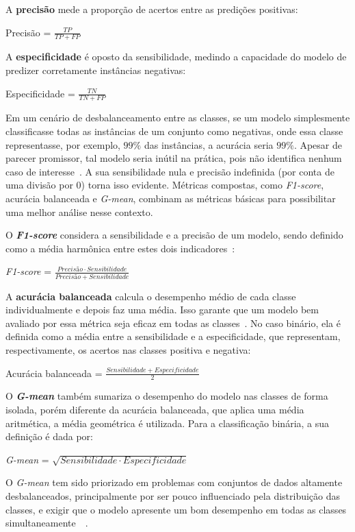 A \textbf{precisão} mede a proporção de acertos entre as predições positivas:
\begin{center}
  Precisão = $\frac{TP}{TP + FP}$
  \label{eq:precisao}
\end{center}

A \textbf{especificidade} é oposto da sensibilidade, medindo a capacidade do modelo de predizer corretamente instâncias negativas:
\begin{center}
  Especificidade = $\frac{TN}{TN + FP}$
  \label{eq:especificidade}
\end{center}

Em um cenário de desbalanceamento entre as classes, se um modelo simplesmente classificasse todas as instâncias de um conjunto como negativas, onde essa classe representasse, por exemplo, \(99\%\) das instâncias, a acurácia seria \(99\%\). Apesar de parecer promissor, tal modelo seria inútil na prática, pois não identifica nenhum caso de interesse~\cite{Naidu2023}. A sua sensibilidade nula e precisão indefinida (por conta de uma divisão por \(0\)) torna isso evidente. Métricas compostas, como \textit{F1-score}, acurácia balanceada e \textit{G-mean}, combinam as métricas básicas para possibilitar uma melhor análise nesse contexto.

O \textbf{\textit{F1-score}} considera a sensibilidade e a precisão de um modelo, sendo definido como a média harmônica entre estes dois indicadores~\cite{Grandini2020}:
\begin{center}
  \textit{F1-score} = $\frac{Precisão \cdot Sensibilidade}{Precisão + Sensibilidade}$
  \label{eq:f1-score}
\end{center}

A \textbf{acurácia balanceada} calcula o desempenho médio de cada classe individualmente e depois faz uma média. Isso garante que um modelo bem avaliado por essa métrica seja eficaz em todas as classes~\cite{Grandini2020}. No caso binário, ela é definida como a média entre a sensibilidade e a especificidade, que representam, respectivamente, os acertos nas classes positiva e negativa:
\begin{center}
  Acurácia balanceada = $\frac{Sensibilidade + Especificidade}{2}$
  \label{eq:acuracia-balanceada}
\end{center}

O \textbf{\textit{G-mean}} também sumariza o desempenho do modelo nas classes de forma isolada, porém diferente da acurácia balanceada, que aplica uma média aritmética, a média geométrica é utilizada. Para a classificação binária, a sua definição é dada por:
\begin{center}
  \textit{G-mean} = $\sqrt{Sensibilidade \cdot Especificidade}$
  \label{g-mean}
\end{center}
O \textit{G-mean} tem sido priorizado em problemas com conjuntos de dados altamente desbalanceados, principalmente por ser pouco influenciado pela distribuição das classes, e exigir que o modelo apresente um bom desempenho em todas as classes simultaneamente~~\cite{Namvar2018,Ri2020}.

